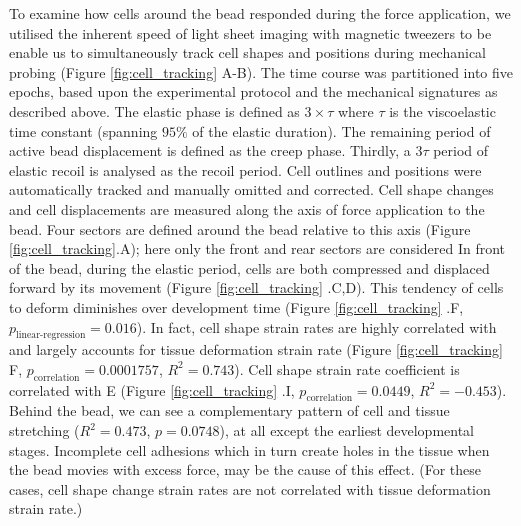 To examine how cells around the bead responded during the force application, we utilised the inherent speed of light sheet imaging with magnetic tweezers to be enable us to simultaneously track cell shapes and positions during mechanical probing (Figure \ref{fig:cell_tracking} A-B).
The time course was partitioned into five epochs, based upon the experimental protocol and the mechanical signatures as described above.
The elastic phase is defined as  $3\times\tau$ where $\tau$ is the viscoelastic time constant (spanning $95\%$ of the elastic duration).
The remaining period of active bead displacement is defined as the creep phase.
Thirdly, a $3\tau$ period of elastic recoil is analysed as the recoil period.
Cell outlines and positions were automatically tracked and manually omitted and corrected.
Cell shape changes and cell displacements are measured along the axis of force application to the bead.
Four sectors are defined around the bead relative to this axis (Figure \ref{fig:cell_tracking}.A); here only the front and rear sectors are considered
In front of the bead, during the elastic period, cells are both compressed and displaced forward by its movement (Figure \ref{fig:cell_tracking} .C,D).
This tendency of cells to deform diminishes over development time (Figure \ref{fig:cell_tracking} .F, $p_\text{linear-regression} = 0.016$).
In fact, cell shape strain rates are highly correlated with and largely accounts for tissue deformation strain rate (Figure \ref{fig:cell_tracking} F, $p_\text{correlation} = 0.0001757$, $R^2 = 0.743$).
Cell shape strain rate coefficient is correlated with E (Figure \ref{fig:cell_tracking} .I, ${p_\text{correlation}} = 0.0449$, $R^2 = -0.453$).
Behind the bead, we can see a complementary pattern of cell and tissue stretching ($R^2 = 0.473$, $p = 0.0748$), at all except the earliest developmental stages.
Incomplete cell adhesions which in turn create holes in the tissue when the bead movies with excess force, may be the cause of this effect.
(For these cases, cell shape change strain rates are not correlated with tissue deformation strain rate.)
